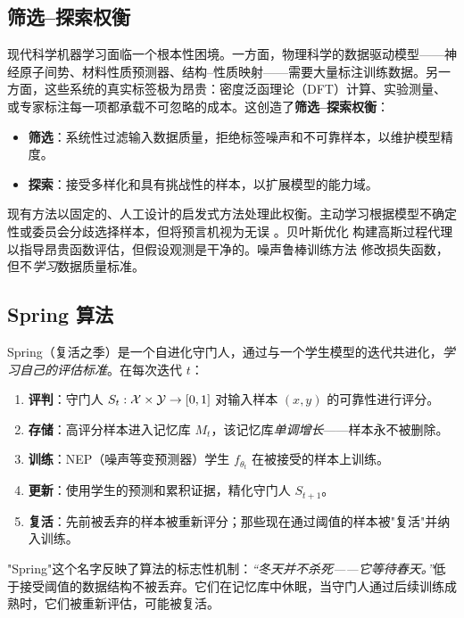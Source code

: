 \subsection{筛选--探索权衡}

现代科学机器学习面临一个根本性困境。一方面，物理科学的数据驱动模型——神经原子间势、材料性质预测器、结构--性质映射——需要大量标注训练数据。另一方面，这些系统的真实标签极为昂贵：密度泛函理论（DFT）计算、实验测量、或专家标注每一项都承载不可忽略的成本。这创造了\textbf{筛选--探索权衡}：

\begin{itemize}[nosep]
    \item \textbf{筛选}：系统性过滤输入数据质量，拒绝标签噪声和不可靠样本，以维护模型精度。
    \item \textbf{探索}：接受多样化和具有挑战性的样本，以扩展模型的能力域。
\end{itemize}

现有方法以固定的、人工设计的启发式方法处理此权衡。主动学习根据模型不确定性或委员会分歧选择样本，但将预言机视为无误 \citep{settles2009}。贝叶斯优化 \citep{srinivas2010} 构建高斯过程代理以指导昂贵函数评估，但假设观测是干净的。噪声鲁棒训练方法 \citep{natarajan2013} 修改损失函数，但不\textit{学习}数据质量标准。

\subsection{Spring 算法}

Spring（复活之季）是一个自进化守门人，通过与一个学生模型的迭代共进化，\textit{学习自己的评估标准}。在每次迭代 $t$：

\begin{enumerate}[nosep]
    \item \textbf{评判}：守门人 $S_t: \mathcal{X} \times \mathcal{Y} \to [0,1]$ 对输入样本 $(x, y)$ 的可靠性进行评分。
    \item \textbf{存储}：高评分样本进入记忆库 $M_t$，该记忆库\textit{单调增长}——样本永不被删除。
    \item \textbf{训练}：NEP（噪声等变预测器）学生 $f_{\theta_t}$ 在被接受的样本上训练。
    \item \textbf{更新}：使用学生的预测和累积证据，精化守门人 $S_{t+1}$。
    \item \textbf{复活}：先前被丢弃的样本被重新评分；那些现在通过阈值的样本被"复活"并纳入训练。
\end{enumerate}

"Spring"这个名字反映了算法的标志性机制：\textit{``冬天并不杀死——它等待春天。''}低于接受阈值的数据结构不被丢弃。它们在记忆库中休眠，当守门人通过后续训练成熟时，它们被重新评估，可能被复活。


